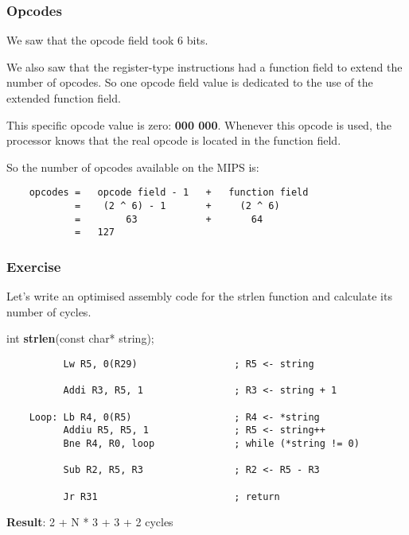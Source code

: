 
\begin{frame}[containsverbatim]
  \frametitle{Opcodes}

  We saw that the opcode field took 6 bits.

  \nl

  We also saw that the register-type instructions had a function field
  to extend the number of opcodes. So one opcode field value is
  dedicated to the use of the extended function field.

  \nl

  This specific opcode value is zero: \textbf{000 000}. Whenever this
  opcode is used, the processor knows that the real opcode is located
  in the function field.

  \nl

  So the number of opcodes available on the MIPS is:

  \begin{verbatim}
    opcodes =   opcode field - 1   +   function field
            =    (2 ^ 6) - 1       +     (2 ^ 6)
            =        63            +       64
            =   127
  \end{verbatim}
\end{frame}

%
%

\begin{frame}[containsverbatim]
  \frametitle{Exercise}

  Let's write an optimised assembly code for the strlen function and
  calculate its number of cycles.

  \nl

  int \textbf{strlen}(const char* string);

  \begin{verbatim}
          Lw R5, 0(R29)                 ; R5 <- string

          Addi R3, R5, 1                ; R3 <- string + 1

    Loop: Lb R4, 0(R5)                  ; R4 <- *string
          Addiu R5, R5, 1               ; R5 <- string++
          Bne R4, R0, loop              ; while (*string != 0)

          Sub R2, R5, R3                ; R2 <- R5 - R3

          Jr R31                        ; return
  \end{verbatim}

  \textbf{Result}: 2 + N * 3 + 3 + 2 cycles
\end{frame}

